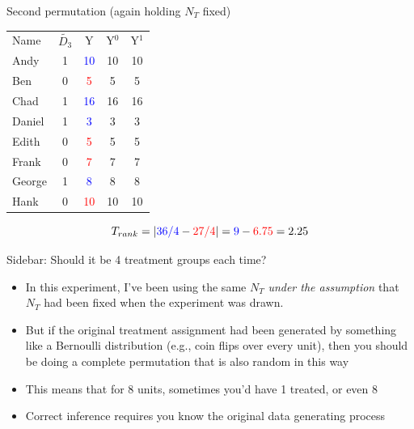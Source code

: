 \documentclass{beamer}
\begin{document}
\begin{frame}{Second permutation (again holding $N_T$ fixed)}

\begin{table}[htbp]\centering
\begin{center}
\begin{threeparttable}
\begin{tabular}{lcccc}
\toprule
\multicolumn{1}{l}{Name}&
\multicolumn{1}{c}{$\tilde{D_3}$}&
\multicolumn{1}{c}{Y}&
\multicolumn{1}{c}{Y$^0$}&
\multicolumn{1}{c}{Y$^1$}\\
Andy		& 1 & \textcolor{blue}{10}  & {10} & 10 \\
Ben		& 0 & \textcolor{red}{5}    & {5} & 5 \\
Chad	& 1 & \textcolor{blue}{16}  & {16} & 16 \\	
Daniel	& 1 &  \textcolor{blue}{3}   & {3} & 3 \\
Edith		& 0 & \textcolor{red}{5}    & 5 & {5} \\
Frank	& 0 & \textcolor{red}{7}    & 7& {7}  \\
George	& 1 & \textcolor{blue}{8}    & 8 & {8} \\
Hank		& 0 & \textcolor{red}{10}  & 10 & {10} \\
\bottomrule
\end{tabular}
\end{threeparttable}
\end{center}
\end{table}

$$T_{rank} =  | \textcolor{blue}{36/4} - \textcolor{red}{27/4}  | = \textcolor{blue}{9} - \textcolor{red}{6.75} = 2.25$$
	
\end{frame}

\begin{frame}{Sidebar: Should it be 4 treatment groups each time?}

\begin{itemize}
\item In this experiment, I've been using the same $N_T$ \emph{under the assumption} that $N_T$ had been fixed when the experiment was drawn.
\item But if the original treatment assignment had been generated by something like a Bernoulli distribution (e.g., coin flips over every unit), then you should be doing a complete permutation that is also random in this way
\item This means that for 8 units, sometimes you'd have 1 treated, or even 8
\item Correct inference requires you know the original data generating process
\end{itemize}

\end{frame}
\end{document}
